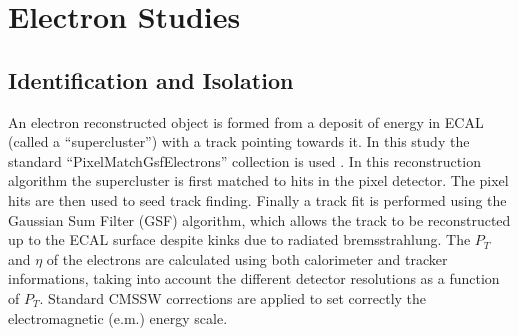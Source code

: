 %

\section{Electron Studies} \label{sec:electrons}

\subsection{Identification and Isolation} \label{sec:IdAndIso}

An electron reconstructed object is formed from a deposit of energy in ECAL (called a ``supercluster'') with a track pointing towards it.
In this study the standard ``PixelMatchGsfElectrons'' collection is used \cite{GSFele}.
In this reconstruction algorithm the supercluster is first matched to hits in the pixel detector.
The pixel hits are then used to seed track finding.  Finally a track fit is performed using the Gaussian Sum Filter 
(GSF) algorithm, which allows the track to be reconstructed up to the ECAL surface
despite kinks due to radiated bremsstrahlung.  
The $P_{T}$ and $\eta$ of the electrons are calculated using both calorimeter and tracker informations, 
taking into account the different detector resolutions as a function of $P_{T}$.
Standard CMSSW corrections are applied to set correctly the electromagnetic (e.m.) energy scale.

